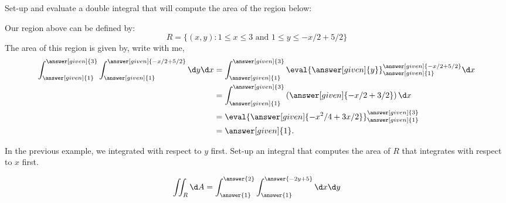 \documentclass{ximera}
\begin{document}
\begin{example}
  Set-up and evaluate a double integral that will compute the area of
  the region below:
  \begin{image}
  \end{image}
  \begin{explanation}
    Our region above can be defined by:
    \[
    R=\{(x,y):\text{$1\leq x\leq 3$ and $1\leq y\leq -x/2+5/2$}\}
    \]
    The area of this region is given by, write with me, 
    \begin{align*}
      \int_{\answer[given]{1}}^{\answer[given]{3}}\int_{\answer[given]{1}}^{\answer[given]{-x/2+5/2}}\d y \d x &= \int_{\answer[given]{1}}^{\answer[given]{3}} \eval{\answer[given]{y}}_{\answer[given]{1}}^{\answer[given]{-x/2+5/2}} \d x\\
      &=  \int_{\answer[given]{1}}^{\answer[given]{3}} \left(\answer[given]{-x/2+3/2}\right) \d x\\
      &=  \eval{\answer[given]{-x^2/4+3x/2}}_{\answer[given]{1}}^{\answer[given]{3}}\\
      &= \answer[given]{1}. 
    \end{align*}
  \end{explanation}
\end{example}

\begin{question}
  In the previous example, we integrated with respect to $y$
  first. Set-up an integral that computes the area of $R$ that
  integrates with respect to $x$ first.
  \begin{prompt}
    \[
    \iint_R \d A = \int_{\answer{1}}^{\answer{2}}\int_{\answer{1}}^{\answer{-2y+5}} \d x \d y
    \]
  \end{prompt}
\end{question}
\end{document}
